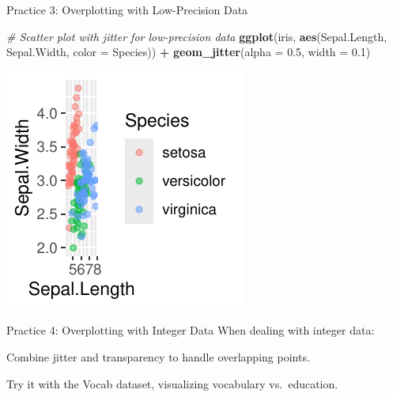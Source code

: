 \documentclass[
  ignorenonframetext,
]{beamer}
\newenvironment{Shaded}{\begin{snugshade}}{\end{snugshade}}
\newcommand{\AttributeTok}[1]{\textcolor[rgb]{0.13,0.29,0.53}{#1}}
\newcommand{\CommentTok}[1]{\textcolor[rgb]{0.56,0.35,0.01}{\textit{#1}}}
\newcommand{\FloatTok}[1]{\textcolor[rgb]{0.00,0.00,0.81}{#1}}
\newcommand{\FunctionTok}[1]{\textcolor[rgb]{0.13,0.29,0.53}{\textbf{#1}}}
\newcommand{\NormalTok}[1]{#1}
\newcommand{\SpecialCharTok}[1]{\textcolor[rgb]{0.81,0.36,0.00}{\textbf{#1}}}
\begin{document}
\begin{frame}[fragile]{Practice 3: Overplotting with Low-Precision Data}
\label{practice-3-overplotting-with-low-precision-data-1}

\begin{Shaded}
\begin{Highlighting}[]
\CommentTok{\# Scatter plot with jitter for low{-}precision data}
\FunctionTok{ggplot}\NormalTok{(iris, }\FunctionTok{aes}\NormalTok{(Sepal.Length, Sepal.Width, }\AttributeTok{color =}\NormalTok{ Species)) }\SpecialCharTok{+}
    \FunctionTok{geom\_jitter}\NormalTok{(}\AttributeTok{alpha =} \FloatTok{0.5}\NormalTok{, }\AttributeTok{width =} \FloatTok{0.1}\NormalTok{)}
\end{Highlighting}
\end{Shaded}

\begin{center}\includegraphics[width=0.5\linewidth]{Figs/unnamed-chunk-35-1} \end{center}
\end{frame}

\begin{frame}{Practice 4: Overplotting with Integer Data}
\label{practice-4-overplotting-with-integer-data}
When dealing with integer data:

Combine jitter and transparency to handle overlapping points.

Try it with the Vocab dataset, visualizing vocabulary vs.~education.
\end{frame}
\end{document}
